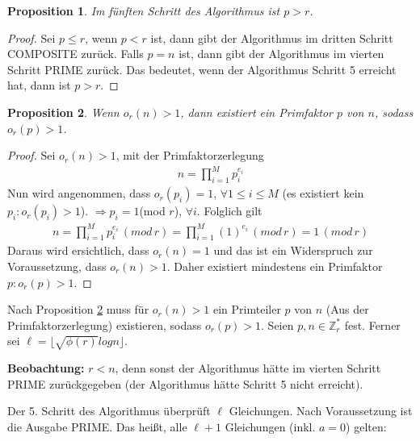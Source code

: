 \documentclass[12pt,oneside]{article}
\newtheorem{prop}{Proposition}[section]
\theoremstyle{remark}
\theoremstyle{definition}
\begin{document}
\begin{prop}\label{pGreaterThnr}
Im fünften Schritt des Algorithmus ist $p > r$.
\end{prop}

\begin{proof}
Sei $p \leq r$, wenn $p < r$ ist, dann gibt der Algorithmus im dritten Schritt COMPOSITE zurück. Falls $p = n$ ist, dann gibt der Algorithmus im vierten Schritt PRIME zurück. Das bedeutet, wenn der Algorithmus Schritt 5 erreicht hat, dann ist $ p > r$.   
\end{proof}

\begin{prop}\label{ord_prime_l}
Wenn $o_{r}(n) > 1$, dann existiert ein Primfaktor $p$ von $n$, sodass $o_{r}(p) > 1$. 
\end{prop}
\begin{proof}
Sei $o_{r}(n) > 1$, mit der Primfaktorzerlegung
\begin{align*}
    n = \prod_{i = 1}^{M} p_{i}^{e_{i}}
\end{align*}
Nun wird angenommen, dass $o_{r}(p_{i}) = 1, \, \forall 1 \leq i \leq M$ (es existiert kein $p_{i} : o_{r}(p_{i}) > 1$).\newline\newline
$\Rightarrow p_{i} = 1 $(mod $r$), $\forall i$. Folglich gilt
\begin{align*}
    n = \prod_{i = 1} ^{M} p_{i}^{e_{i}} \, (mod \, r) = \prod_{i = 1} ^{M}(1)^{e_{i}} \,  (mod \, r) = 1 \, (mod \, r)
\end{align*}
\newline\newline Daraus wird ersichtlich, dass $o_{r}(n) = 1$ und das ist ein Widerspruch zur Voraussetzung, dass $o_{r}(n) > 1$. Daher existiert mindestens ein Primfaktor $p : o_{r}(p) > 1$.  
\end{proof}

Nach Proposition \ref{ord_prime_l} muss für  $o_{r}(n) > 1$ ein Primteiler $p$ von $n$ (Aus der Primfaktorzerlegung) existieren, sodass $o_{r}(p) > 1$. Seien $p,n \in \mathbb{Z}_{r}^{*}$ fest. Ferner sei  $\ell = \lfloor \sqrt{\phi(r)} log n \rfloor$.\newline

\smallskip

\textbf{\small{Beobachtung:}} $r < n$, denn sonst der Algorithmus hätte im vierten Schritt PRIME zurückgegeben (der Algorithmus hätte Schritt 5 nicht erreicht).\newline 

Der 5. Schritt des Algorithmus überprüft $\ell$ Gleichungen. Nach Voraussetzung ist die Ausgabe PRIME. Das heißt, alle  $\ell + 1$  Gleichungen (inkl. $a = 0$) gelten:\newline\newline
\end{document}
